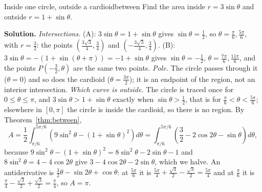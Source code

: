 \documentclass[11pt]{article}
\begin{document}
\begin{exmp}{Inside one circle, outside a cardioid}{between}
Find the area inside $r=3\sin\theta$ and outside $r=1+\sin\theta$.

\textbf{Solution.} \emph{Intersections.} (A): $3\sin\theta=1+\sin\theta$ gives $\sin\theta=\frac12$, so $\theta=\frac\pi6,\frac{5\pi}6$, with $r=\frac32$: the points $\left(\frac{3\sqrt3}4,\frac34\right)$ and $\left(-\frac{3\sqrt3}4,\frac34\right)$. (B): $3\sin\theta=-(1+\sin(\theta+\pi))=-1+\sin\theta$ gives $\sin\theta=-\frac12$, $\theta=\frac{7\pi}6,\frac{11\pi}6$, and the points $P\left(-\frac32,\theta\right)$ are the same two points. \emph{Pole.} The circle passes through it ($\theta=0$) and so does the cardioid ($\theta=\frac{3\pi}2$); it is an endpoint of the region, not an interior intersection. \emph{Which curve is outside.} The circle is traced once for $0\le\theta\le\pi$, and $3\sin\theta>1+\sin\theta$ exactly when $\sin\theta>\frac12$, that is for $\frac\pi6<\theta<\frac{5\pi}6$; elsewhere in $[0,\pi]$ the circle is inside the cardioid, so there is no region. By Theorem~\ref{thm:between},
\[A=\frac12\int_{\pi/6}^{5\pi/6}\left(9\sin^2\theta-(1+\sin\theta)^2\right)d\theta=\int_{\pi/6}^{5\pi/6}\left(\frac32-2\cos2\theta-\sin\theta\right)d\theta,\]
because $9\sin^2\theta-(1+\sin\theta)^2=8\sin^2\theta-2\sin\theta-1$ and $8\sin^2\theta=4-4\cos2\theta$ give $3-4\cos2\theta-2\sin\theta$, which we halve. An antiderivative is $\frac32\theta-\sin2\theta+\cos\theta$: at $\frac{5\pi}6$ it is $\frac{5\pi}4+\frac{\sqrt3}2-\frac{\sqrt3}2=\frac{5\pi}4$ and at $\frac\pi6$ it is $\frac\pi4-\frac{\sqrt3}2+\frac{\sqrt3}2=\frac\pi4$, so $A=\pi$.


\end{exmp}
\end{document}
